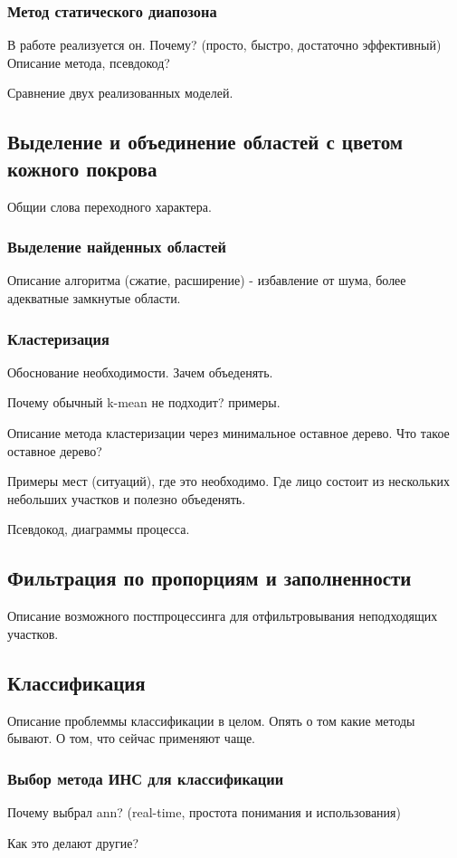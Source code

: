 \documentclass[12pt]{report}
\begin{document}
\subsubsection{Метод статического диапозона}
В работе реализуется он. Почему? (просто, быстро, достаточно эффективный)
Описание метода, псевдокод?

Сравнение двух реализованных моделей.

\subsection{Выделение и объединение областей с цветом кожного покрова}
Общии слова переходного характера. 
\subsubsection{Выделение найденных областей}
Описание алгоритма (сжатие, расширение) -  избавление от шума, более адекватные замкнутые области.
\subsubsection{Кластеризация}
Обоснование необходимости. Зачем объеденять.	

Почему обычный k-mean не подходит? примеры.

Описание метода кластеризации через минимальное оставное дерево. Что такое оставное дерево?

Примеры мест (ситуаций), где это необходимо. Где лицо состоит из нескольких небольших участков и полезно объеденять.

Псевдокод, диаграммы процесса.
\subsection{Фильтрация по пропорциям и заполненности}
Описание возможного постпроцессинга для отфильтровывания неподходящих участков.
\subsection{Классификация}
Описание проблеммы классификации в целом.
Опять о том какие методы бывают. О том, что сейчас применяют чаще.
\subsubsection{Выбор метода ИНС для классификации}
Почему выбрал ann? (real-time, простота понимания и использования)

Как это делают другие?
\end{document}

